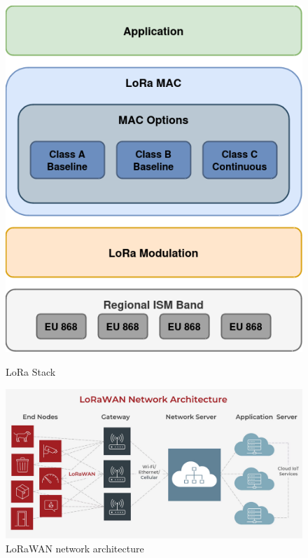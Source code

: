 \begin{figure}[h]
    \centering
    \begin{minipage}[t]{0.3\textwidth}
        \centering
        \includegraphics[width=\textwidth]{img/lora_stack}
        \caption{LoRa Stack}
    \end{minipage}
    \begin{minipage}[t]{0.65\textwidth}
        \centering
        \includegraphics[width=\textwidth]{img/lora_network}
        \caption {LoRaWAN network architecture}
        \label{fig:lora_net}
    \end{minipage}
\end{figure}
